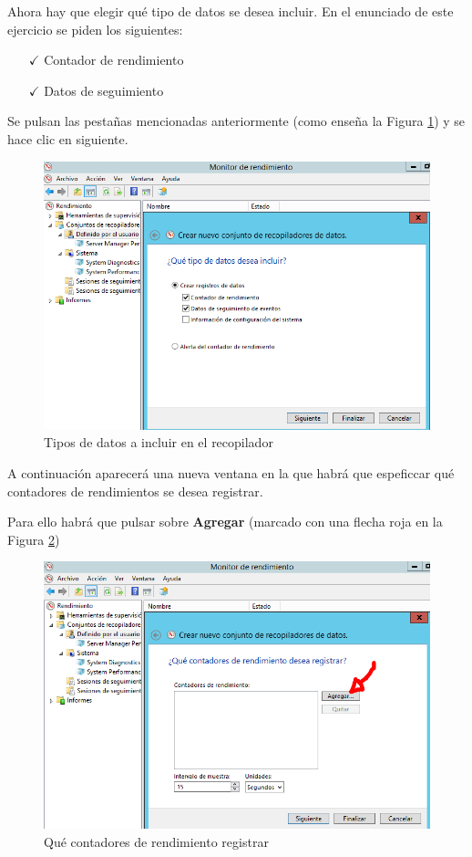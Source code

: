 	Ahora hay que elegir qué tipo de datos se desea incluir. En el enunciado de este ejercicio se piden los siguientes:	
	\begin{itemize}
		\item [$ \checkmark $] Contador de rendimiento 
		\item [$ \checkmark $] Datos de	seguimiento
	\end{itemize}
	
	Se pulsan las pestañas mencionadas anteriormente  (como enseña la Figura \ref{fig:figura11}) y se hace clic en siguiente.
	
	\begin{figure}[H] %
		\centering
		\includegraphics[scale=0.55]{figuras/figura11.png} 
		\caption{Tipos de datos a incluir en el recopilador} 
		\label{fig:figura11}
	\end{figure}
	
	A continuación aparecerá una nueva ventana en la que habrá que espeficcar qué contadores de rendimientos se desea registrar.
	
	Para ello habrá que pulsar sobre \textbf{Agregar} (marcado con una flecha roja en la Figura \ref{fig:figura12})
	
	\begin{figure}[H] %
		\centering
		\includegraphics[scale=0.7]{figuras/figura12.png} 
		\caption{Qué contadores de rendimiento registrar} 
		\label{fig:figura12}
	\end{figure}
	
